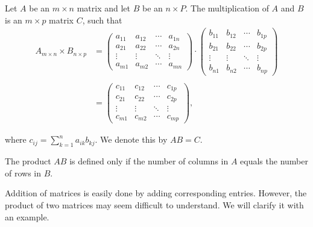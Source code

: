 \documentclass{subfile}
\begin{document}
	\begin{definition}\label{def:matrixproduct}
		Let $A$ be an $m\times n$ matrix and let $B$ be an $n\times P$. The multiplication of $A$ and $B$ is an $m \times p$ matrix $C$, such that
		\begin{align*}
		{A_{m \times n}} \times {B_{n \times p}} &= \begin{pmatrix}
			{{a_{11}}}&{{a_{12}}}& \cdots &{{a_{1n}}}\\
			{{a_{21}}}&{{a_{22}}}& \cdots &{{a_{2n}}}\\
			\vdots & \vdots & \ddots & \vdots \\
			{{a_{m1}}}&{{a_{m2}}}& \cdots &{{a_{mn}}}
				\end{pmatrix} \cdot \begin{pmatrix}
			{{b_{11}}}&{{b_{12}}}& \cdots &{{b_{1p}}}\\
			{{b_{21}}}&{{b_{22}}}& \cdots &{{b_{2p}}}\\
			\vdots & \vdots & \ddots & \vdots \\
			{{b_{n1}}}&{{b_{n2}}}& \cdots &{{b_{np}}}
			\end{pmatrix}\\
		\\
		&= \begin{pmatrix}
			{{c_{11}}}&{{c_{12}}}& \cdots &{{c_{1p}}}\\
			{{c_{21}}}&{{c_{22}}}& \cdots &{{c_{2p}}}\\
			\vdots & \vdots & \ddots & \vdots \\
			{{c_{m1}}}&{{c_{m2}}}& \cdots &{{c_{mp}}}
		\end{pmatrix},
		\end{align*}

		where $c_{ij}= \displaystyle\sum_{k=1}^{n} a_{ik}b_{kj}$. We denote this by $AB=C$.
	\end{definition}


	\begin{note}
		The product $AB$ is defined only if the number of columns in $A$ equals the number of rows in $B$.
	\end{note}


Addition of matrices is easily done by adding corresponding entries. However, the product of two matrices may seem difficult to understand. We will clarify it with an example.
\end{document}
